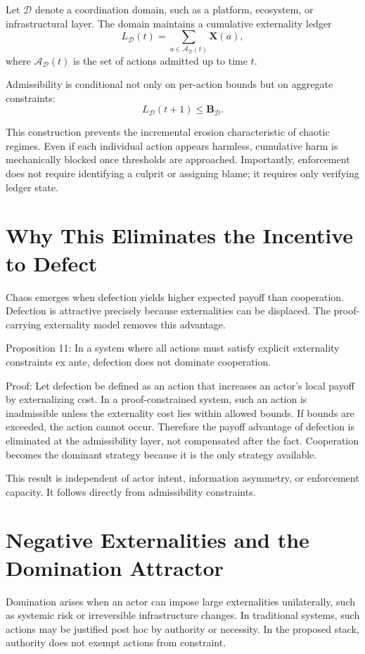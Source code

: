 \documentclass[11pt,oneside]{article}
\begin{document}
Let \( \mathcal{D} \) denote a coordination domain, such as a platform, ecosystem, or infrastructural layer. The domain maintains a cumulative externality ledger
\[
L_{\mathcal{D}}(t) = \sum_{a \in \mathcal{A}_{\mathcal{D}}(t)} \mathbf{X}(a),
\]
where \( \mathcal{A}_{\mathcal{D}}(t) \) is the set of actions admitted up to time \( t \).

Admissibility is conditional not only on per-action bounds but on aggregate constraints:
\[
L_{\mathcal{D}}(t+1) \leq \mathbf{B}_{\mathcal{D}}.
\]

This construction prevents the incremental erosion characteristic of chaotic regimes. Even if each individual action appears harmless, cumulative harm is mechanically blocked once thresholds are approached. Importantly, enforcement does not require identifying a culprit or assigning blame; it requires only verifying ledger state.

\section{Why This Eliminates the Incentive to Defect}

Chaos emerges when defection yields higher expected payoff than cooperation. Defection is attractive precisely because externalities can be displaced. The proof-carrying externality model removes this advantage.

Proposition 11: In a system where all actions must satisfy explicit externality constraints ex ante, defection does not dominate cooperation.

Proof: Let defection be defined as an action that increases an actor’s local payoff by externalizing cost. In a proof-constrained system, such an action is inadmissible unless the externality cost lies within allowed bounds. If bounds are exceeded, the action cannot occur. Therefore the payoff advantage of defection is eliminated at the admissibility layer, not compensated after the fact. Cooperation becomes the dominant strategy because it is the only strategy available.

This result is independent of actor intent, information asymmetry, or enforcement capacity. It follows directly from admissibility constraints.

\section{Negative Externalities and the Domination Attractor}

Domination arises when an actor can impose large externalities unilaterally, such as systemic risk or irreversible infrastructure changes. In traditional systems, such actions may be justified post hoc by authority or necessity. In the proposed stack, authority does not exempt actions from constraint.
\end{document}
